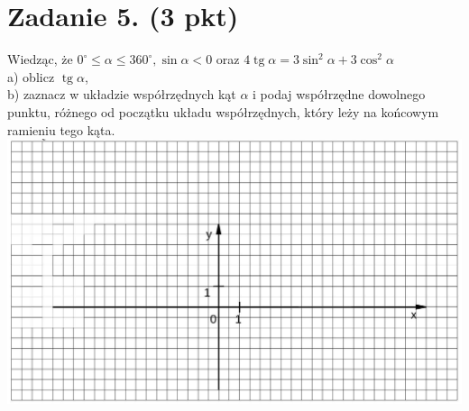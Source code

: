 \documentclass[10pt]{article}
\begin{document}
\section*{Zadanie 5. (3 pkt)}
Wiedząc, że \(0^{\circ} \leq \alpha \leq 360^{\circ}, \sin \alpha<0\) oraz \(4 \operatorname{tg} \alpha=3 \sin ^{2} \alpha+3 \cos ^{2} \alpha\)\\
a) oblicz \(\operatorname{tg} \alpha\),\\
b) zaznacz w układzie współrzędnych kąt \(\alpha\) i podaj współrzędne dowolnego punktu, różnego od początku układu współrzędnych, który leży na końcowym ramieniu tego kąta.\\
\includegraphics[max width=\textwidth, center]{2024_11_21_99a977d92f90f1d0fb7fg-06}
\end{document}

